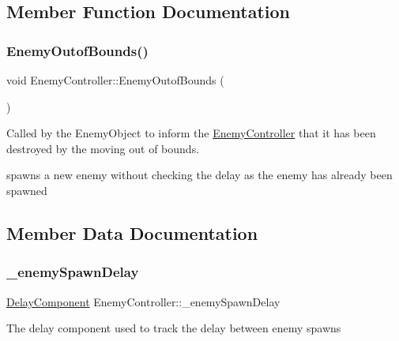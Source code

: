 \subsection{Member Function Documentation}
\mbox{\label{class_enemy_controller_a182dba707716f8079bb6e67e8c5ed4ad}} 
\subsubsection{\texorpdfstring{Enemy\+Outof\+Bounds()}{EnemyOutofBounds()}}
{\footnotesize\ttfamily void Enemy\+Controller\+::\+Enemy\+Outof\+Bounds (\begin{DoxyParamCaption}{ }\end{DoxyParamCaption})}



Called by the Enemy\+Object to inform the \hyperlink{class_enemy_controller}{Enemy\+Controller} that it has been destroyed by the moving out of bounds. 

spawns a new enemy without checking the delay as the enemy has already been spawned 

\subsection{Member Data Documentation}
\mbox{\label{class_enemy_controller_af6136b2e8750227e8adf729c9de5232b}} 
\subsubsection{\texorpdfstring{\+\_\+enemy\+Spawn\+Delay}{\_enemySpawnDelay}}
{\footnotesize\ttfamily \hyperlink{class_delay_component}{Delay\+Component} Enemy\+Controller\+::\+\_\+enemy\+Spawn\+Delay\hspace{0.3cm}{\ttfamily [private]}}

The delay component used to track the delay between enemy spawns \mbox{\label{class_enemy_controller_a673e9320e737999189b943216f6d379b}} 
